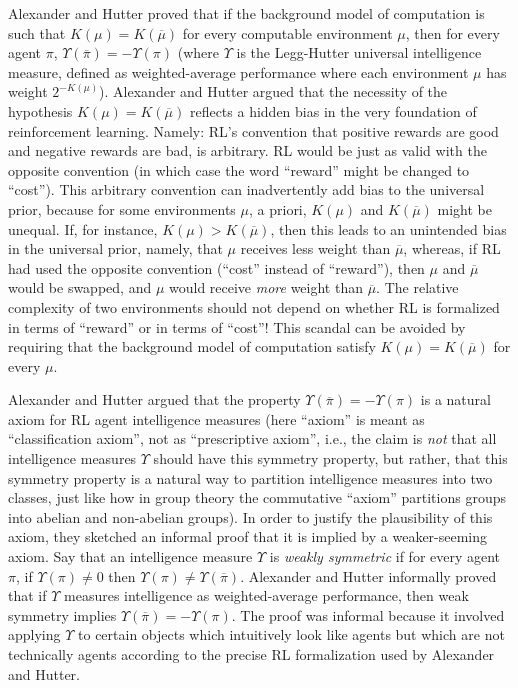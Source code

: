 \documentclass[runningheads]{llncs}
\begin{document}
Alexander and Hutter proved that if the background model of computation is such that
$K(\mu)=K(\overline\mu)$ for every computable environment $\mu$, then for every agent $\pi$,
$\Upsilon(\overline\pi)=-\Upsilon(\pi)$ (where $\Upsilon$ is the Legg-Hutter universal
intelligence measure, defined as weighted-average performance where each environment $\mu$
has weight $2^{-K(\mu)}$).
Alexander and Hutter argued that the necessity of the hypothesis $K(\mu)=K(\overline\mu)$
reflects a hidden bias in the very foundation of reinforcement learning.
Namely: RL's convention that positive rewards are good and negative rewards are bad,
is arbitrary. RL would be just as valid with the opposite convention (in which case the
word ``reward'' might be changed to ``cost''). This arbitrary convention can inadvertently
add bias to the universal prior, because for some environments $\mu$, a priori, $K(\mu)$ and
$K(\overline\mu)$ might be unequal. If, for instance, $K(\mu)>K(\overline\mu)$, then this
leads to an unintended bias in the universal prior, namely, that $\mu$ receives less weight
than $\overline\mu$, whereas, if RL had used the opposite convention (``cost'' instead of
``reward''), then $\mu$ and $\overline\mu$ would be swapped, and $\mu$ would receive
\emph{more} weight than $\overline\mu$. The relative complexity of two environments should
not depend on whether RL is formalized in terms of ``reward'' or in terms of ``cost''!
This scandal can be avoided by requiring that the background model of computation satisfy
$K(\mu)=K(\overline\mu)$ for every $\mu$.

Alexander and Hutter argued that the property $\Upsilon(\overline\pi)=-\Upsilon(\pi)$
is a natural axiom for RL agent intelligence measures
(here ``axiom'' is meant as ``classification axiom'', not as
``prescriptive axiom'', i.e., the claim is \emph{not} that all intelligence
measures $\Upsilon$ should have this symmetry property, but rather, that
this symmetry property is a natural way to partition intelligence measures into two
classes, just like how in group theory the commutative ``axiom'' partitions
groups into abelian and non-abelian groups). In order to justify the plausibility of this
axiom, they sketched an informal proof that it is implied by a weaker-seeming axiom.
Say that an intelligence measure $\Upsilon$ is \emph{weakly symmetric} if for every agent
$\pi$, if $\Upsilon(\pi)\not=0$ then $\Upsilon(\pi)\not=\Upsilon(\overline\pi)$.
Alexander and Hutter informally proved that if $\Upsilon$ measures intelligence as
weighted-average performance, then weak symmetry
implies $\Upsilon(\overline\pi)=-\Upsilon(\pi)$. The proof was informal because it
involved applying $\Upsilon$ to certain objects which intuitively look like agents but
which are not technically agents according to the precise RL formalization used by
Alexander and Hutter.
\end{document}

